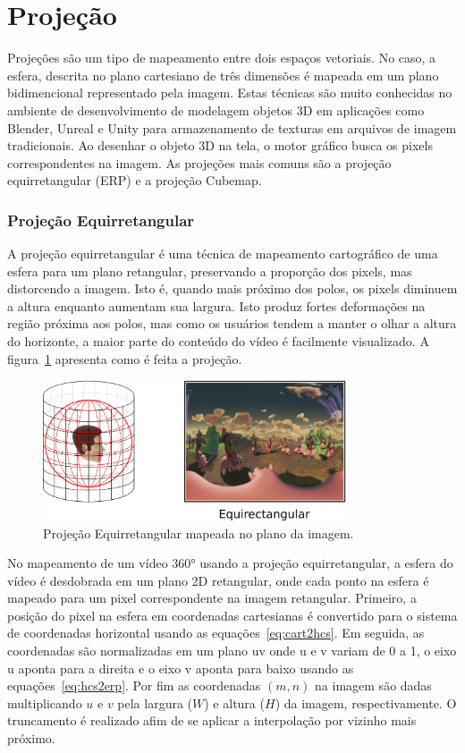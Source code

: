 {\section{Projeção}

Projeções são um tipo de mapeamento entre dois espaços vetoriais. No caso, a esfera, descrita no plano cartesiano de três dimensões é mapeada em um plano bidimencional representado pela imagem. Estas técnicas são muito conhecidas no ambiente de desenvolvimento de modelagem objetos 3D em aplicações como Blender, Unreal e Unity para armazenamento de texturas em arquivos de imagem tradicionais. Ao desenhar o objeto 3D na tela, o motor gráfico busca os pixels correspondentes na imagem. As projeções mais comuns são a projeção equirretangular (ERP) e a projeção Cubemap. 

\subsubsection{Projeção Equirretangular}

A projeção equirretangular é uma técnica de mapeamento cartográfico de uma esfera para um plano retangular, preservando a proporção dos pixels, mas distorcendo a imagem. Isto é, quando mais próximo dos polos, os pixels diminuem a altura enquanto aumentam sua largura. Isto produz fortes deformações na região próxima aos polos, mas como os usuários tendem a manter o olhar a altura do horizonte, a maior parte do conteúdo do vídeo é facilmente visualizado. A figura~\ref{fig:erp} apresenta como é feita a projeção.

\begin{figure}
	\centering
	\includegraphics[width=0.8\textwidth]{fig/erp.png}
	\caption{Projeção Equirretangular mapeada no plano da imagem.}
	\label{fig:erp}
\end{figure}

No mapeamento de um vídeo 360° usando a projeção equirretangular, a esfera do vídeo é desdobrada em um plano 2D retangular, onde cada ponto na esfera é mapeado para um pixel correspondente na imagem retangular. Primeiro, a posição do pixel na esfera em coordenadas cartesianas é convertido para o sistema de coordenadas horizontal usando as equações~\ref{eq:cart2hcs}. Em seguida, as coordenadas são normalizadas em um plano uv onde u e v variam de 0 a 1, o eixo u aponta para a direita e o eixo v aponta para baixo usando as equações~\ref{eq:hcs2erp}. Por fim as coordenadas $(m, n)$ na imagem são dadas multiplicando $u$ e $v$ pela largura ($W$) e altura ($H$) da  imagem, respectivamente. O truncamento é realizado afim de se aplicar a interpolação por vizinho mais próximo.

}
